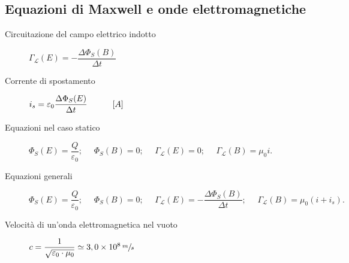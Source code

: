 \documentclass[a4paper,11pt,italian]{article}
\begin{document}
\subsection{Equazioni di Maxwell e onde elettromagnetiche}

\begin{description}
  \item[Circuitazione del campo elettrico indotto] 
  $ \Gamma_\mathscr{L}(E) = - \dfrac{\Delta \Phi_S(B)}{\Delta t}  $
  
  \item[Corrente di spostamento] 
  $ i_s = \varepsilon_0 \dfrac{\Delta \Phi_S(E)}{\Delta t} \hspace*{3em} [A]$
  
  \item[Equazioni nel caso statico] $ \Phi_S(E) = \dfrac{Q}{\varepsilon_0}; ~~~~~~ \Phi_S(B) = 0; ~~~~~~ \Gamma_\mathscr{L}(E) = 0; ~~~~~~ \Gamma_\mathscr{L}(B) = \mu_0 i.$

  \item[Equazioni generali] $ \Phi_S(E) = \dfrac{Q}{\varepsilon_0}; ~~~~~~ \Phi_S(B) = 0; ~~~~~~ \Gamma_\mathscr{L}(E) = - \dfrac{\Delta\Phi_S(B)}{\Delta t}; ~~~~~~ \Gamma_\mathscr{L}(B) = \mu_0 \left( i + i_s \right) .$

  
%   
  
  \item[Velocità di un'onda elettromagnetica nel vuoto] 
  $ c = \dfrac{1}{\sqrt{\varepsilon_0\cdot \mu_0}} \simeq 3,0 \times 10^8 \,	\sfrac{m}{s} $
  

\end{description}
\end{document}
